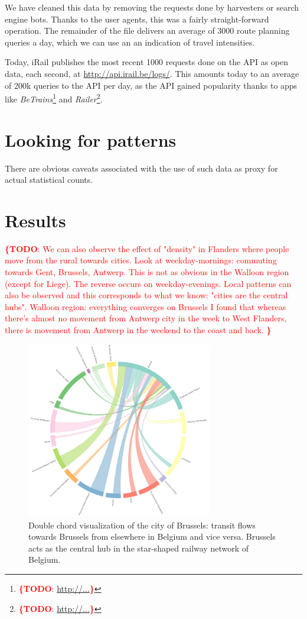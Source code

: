 \documentclass{sig-alternate}
\newcommand{\todo}[1]{\noindent\textcolor{red}{{\bf \{TODO}: #1{\bf \}}}}
\begin{document}
We have cleaned this data by removing the requests done by harvesters or search engine bots.
Thanks to the user agents, this was a fairly straight-forward operation.
The remainder of the file delivers an average of 3000 route planning queries a day, which we can use an an indication of travel intensities.

Today, iRail publishes the most recent 1000 requests done on the API as open data, each second, at \url{http://api.irail.be/logs/}.
This amounts today to an average of 200k queries to the API per day, as the API gained popularity thanks to apps like \emph{BeTrains}\footnote{\todo{\url{http://...}}} and \emph{Railer}\footnote{\todo{\url{http://...}}}.


\section{Looking for patterns}
\label{sec:method}

There are obvious caveats associated with the use of such data as proxy for actual statistical counts.

\section{Results}
\label{sec:results}

\todo{
We can also observe the effect of "density" in Flanders where people move from the rural towards cities. Look at weekday-mornings: commuting towards Gent, Brussels, Antwerp. This is not as obvious in the Walloon region (except for Liege). The reverse occurs on weekday-evenings. Local patterns can also be observed and this corresponds to what we know: "cities are the central hubs".
Walloon region: everything converges on Brussels
I found that whereas there's almost no movement from Antwerp city in the week to West Flanders, there is movement from Antwerp in the weekend to the coast and back. 
}

\begin{figure}
\centering
\includegraphics[width=8.1cm,align=center]{brussels}
\caption{Double chord visualization of the city of Brussels: transit flows towards Brussels from elsewhere in Belgium and vice versa. Brussels acts as the central hub in the star-shaped railway network of Belgium.}
\label{fig:brussels}
\end{figure}
\end{document}
